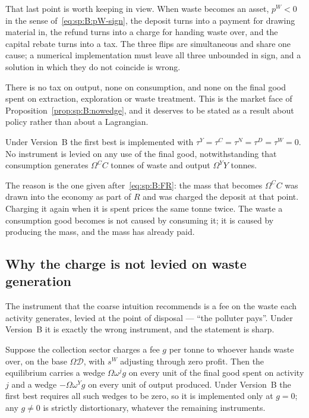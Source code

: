 That last point is worth keeping in view. When waste becomes an asset, $p^W<0$ in the sense
of~\eqref{eq:sp:B:pW-sign}, the deposit turns into a payment for drawing material in, the refund turns
into a charge for handing waste over, and the capital rebate turns into a tax. The three flips are
simultaneous and share one cause; a numerical implementation must leave all three unbounded in sign,
and a solution in which they do not coincide is wrong.

 There is no tax on output, none on consumption, and none on the final good
spent on extraction, exploration or waste treatment. This is the market face of
Proposition~\ref{prop:sp:B:nowedge}, and it deserves to be stated as a result about policy rather than
about a Lagrangian.

\begin{proposition}\label{prop:mkt:B:nowedge}
Under Version~B the first best is implemented with $\tau^Y=\tau^C=\tau^N=\tau^D=\tau^W=0$. No
instrument is levied on any use of the final good, notwithstanding that consumption generates
$\Omega^CC$ tonnes of waste and output $\Omega^YY$ tonnes.
\end{proposition}

The reason is the one given after~\eqref{eq:sp:B:FR}: the mass that becomes $\Omega^CC$ was drawn into
the economy as part of $R$ and was charged the deposit at that point. Charging it again when it is
spent prices the same tonne twice. The waste a consumption good becomes is not caused by consuming it;
it is caused by producing the mass, and the mass has already paid.


\subsection{Why the charge is not levied on waste generation}\label{sec:mkt:B:nogate}

The instrument that the coarse intuition recommends is a fee on the waste each activity generates,
levied at the point of disposal --- ``the polluter pays''. Under Version~B it is exactly the wrong
instrument, and the statement is sharp.

\begin{proposition}\label{prop:mkt:B:nogate}
Suppose the collection sector charges a fee $g$ per tonne to whoever hands waste over, on the base
$\Omega\mathcal D$, with $s^W$ adjusting through zero profit. Then the equilibrium carries a wedge
$\Omega\omega^jg$ on every unit of the final good spent on activity $j$ and a wedge
$-\Omega\omega^Yg$ on every unit of output produced. Under Version~B the first best requires all such
wedges to be zero, so it is implemented only at $g=0$; any $g\neq0$ is strictly distortionary, whatever
the remaining instruments.
\end{proposition}

